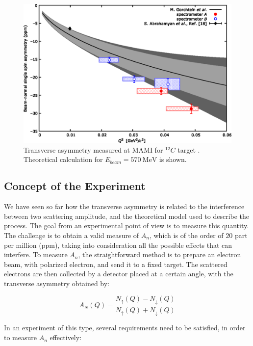 \begin{figure}[hbtp]
\centering
\includegraphics[scale = 0.5]{Transverse/medium.png}
\caption{Transverse asymmetry measured at MAMI for $^{12}C$ target \cite{Esser:2018vdp}. Theoretical calculation for $E_{beam} = \SI{570}{\mega \electronvolt}$  is shown.}
\end{figure}


\subsection{Concept of the Experiment}

We have seen so far how the transverse asymmetry is related to the interference between two scattering amplitude, and the theoretical model used to describe the process. The goal from an experimental point of view is to measure this quantity. The challenge is to obtain a valid measure of $A_{n}$, which is of the order of $20$ part per million (ppm), taking into consideration all the possible effects that can interfere. To measure $A_{n}$, the straightforward method is to prepare an electron beam, with polarized electron, and send it to a fixed target. The scattered electrons are then collected by a detector placed at a certain angle, with the transverse asymmetry obtained by:

\begin{equation}
A_{N} (Q) = \dfrac{N_{\uparrow}(Q) - N_{\downarrow}(Q)}{N_{\uparrow}(Q) + N_{\downarrow}(Q)}  
\end{equation} 

In an experiment of this type, several requirements need to be satisfied, in order to measure $A_{n}$ effectively:

